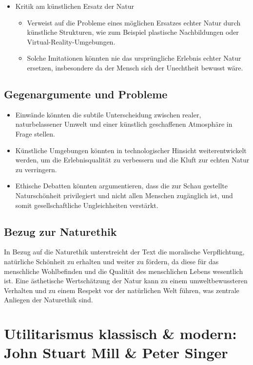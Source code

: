 \documentclass{article}
\begin{document}
\begin{itemize}
	\item Kritik am künstlichen Ersatz der Natur
	      \begin{itemize}
		      \item Verweist auf die Probleme eines möglichen Ersatzes echter Natur durch künstliche Strukturen, wie zum Beispiel plastische Nachbildungen oder Virtual-Reality-Umgebungen.
		      \item Solche Imitationen könnten nie das ursprüngliche Erlebnis echter Natur ersetzen, insbesondere da der Mensch sich der Unechtheit bewusst wäre.
	      \end{itemize}
\end{itemize}

\subsection*{Gegenargumente und Probleme}
\begin{itemize}
	\item Einwände könnten die subtile Unterscheidung zwischen realer, naturbelassener Umwelt und einer künstlich geschaffenen Atmosphäre in Frage stellen.
	\item Künstliche Umgebungen könnten in technologischer Hinsicht weiterentwickelt werden, um die Erlebnisqualität zu verbessern und die Kluft zur echten Natur zu verringern.
	\item Ethische Debatten könnten argumentieren, dass die zur Schau gestellte Naturschönheit privilegiert und nicht allen Menschen zugänglich ist, und somit gesellschaftliche Ungleichheiten verstärkt.
\end{itemize}

\subsection*{Bezug zur Naturethik}
In Bezug auf die Naturethik unterstreicht der Text die moralische Verpflichtung, natürliche Schönheit zu erhalten und weiter zu fördern, da diese für das menschliche Wohlbefinden und die Qualität des menschlichen Lebens wesentlich ist. Eine ästhetische Wertschätzung der Natur kann zu einem umweltbewussteren Verhalten und zu einem Respekt vor der natürlichen Welt führen, was zentrale Anliegen der Naturethik sind.


\newpage
\section{Utilitarismus klassisch \& modern: John Stuart Mill \& Peter Singer}
\end{document}
